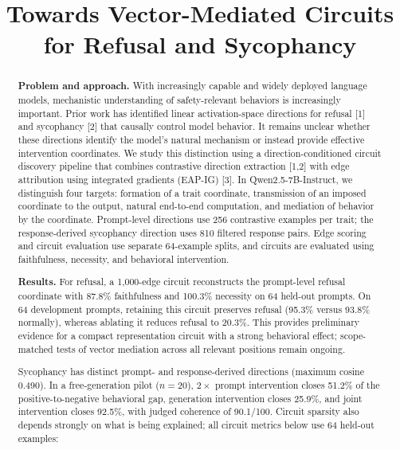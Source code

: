 \documentclass{article}
\title{Towards Vector-Mediated Circuits for Refusal and Sycophancy}
\begin{document}
\maketitle

\begin{abstract}

\noindent\textbf{Problem and approach.}
With increasingly capable and widely deployed language models, mechanistic understanding of safety-relevant behaviors is increasingly important. Prior work has identified linear activation-space directions for refusal [1] and sycophancy [2] that causally control model behavior. It remains unclear whether these directions identify the model's natural mechanism or instead provide effective intervention coordinates. We study this distinction using a direction-conditioned circuit discovery pipeline that combines contrastive direction extraction [1,2] with edge attribution using integrated gradients (EAP-IG) [3]. In Qwen2.5-7B-Instruct, we distinguish four targets: formation of a trait coordinate, transmission of an imposed coordinate to the output, natural end-to-end computation, and mediation of behavior by the coordinate. Prompt-level directions use 256 contrastive examples per trait; the response-derived sycophancy direction uses 810 filtered response pairs. Edge scoring and circuit evaluation use separate 64-example splits, and circuits are evaluated using faithfulness, necessity, and behavioral intervention.

\noindent\textbf{Results.}
For refusal, a 1,000-edge circuit reconstructs the prompt-level refusal coordinate with 87.8\% faithfulness and 100.3\% necessity on 64 held-out prompts. On 64 development prompts, retaining this circuit preserves refusal (95.3\% versus 93.8\% normally), whereas ablating it reduces refusal to 20.3\%. This provides preliminary evidence for a compact representation circuit with a strong behavioral effect; scope-matched tests of vector mediation across all relevant positions remain ongoing.

Sycophancy has distinct prompt- and response-derived directions (maximum cosine 0.490). In a free-generation pilot ($n=20$), $2\times$ prompt intervention closes 51.2\% of the positive-to-negative behavioral gap, generation intervention closes 25.9\%, and joint intervention closes 92.5\%, with judged coherence of 90.1/100. Circuit sparsity also depends strongly on what is being explained; all circuit metrics below use 64 held-out examples:


\end{abstract}
\end{document}
